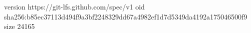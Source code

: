 version https://git-lfs.github.com/spec/v1
oid sha256:b85ec37113d494f9a3bf2248329dd67a4982ef1d7d5349da4192a175046500f9
size 24165
